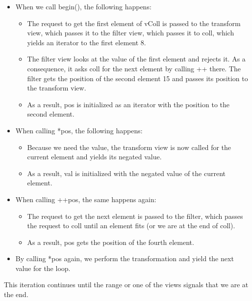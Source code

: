 \begin{itemize}
\item
When we call begin(), the following happens:

\begin{itemize}
\item
The request to get the first element of vColl is passed to the transform view, which passes it to the filter view, which passes it to coll, which yields an iterator to the first element 8.

\item
The filter view looks at the value of the first element and rejects it. As a consequence, it asks coll for the next element by calling ++ there. The filter gets the position of the second element 15 and passes its position to the transform view.

\item
As a result, pos is initialized as an iterator with the position to the second element.
\end{itemize}

\item
When calling *pos, the following happens:

\begin{itemize}
\item
Because we need the value, the transform view is now called for the current element and yields its negated value.

\item
As a result, val is initialized with the negated value of the current element.
\end{itemize}

\item
When calling ++pos, the same happens again:

\begin{itemize}
\item
The request to get the next element is passed to the filter, which passes the request to coll until an element fits (or we are at the end of coll).

\item
As a result, pos gets the position of the fourth element.
\end{itemize}

\item
By calling *pos again, we perform the transformation and yield the next value for the loop.
\end{itemize}

This iteration continues until the range or one of the views signals that we are at the end.

